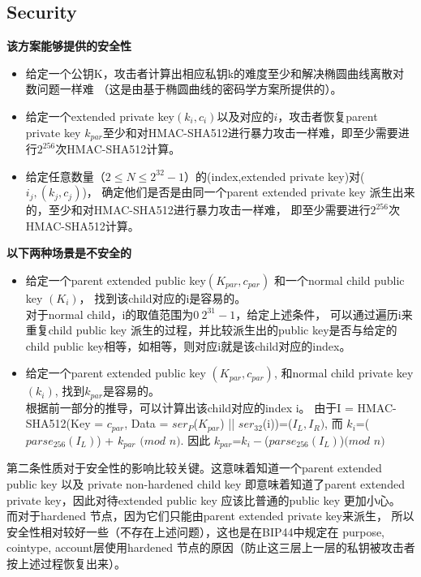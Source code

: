 \subsection{Security}
\label{sec-security}
\textbf{该方案能够提供的安全性}
\begin{itemize}
\item 给定一个公钥K，攻击者计算出相应私钥k的难度至少和解决椭圆曲线离散对数问题一样难
（这是由基于椭圆曲线的密码学方案所提供的）。
\item 给定一个extended private key$(k_i,c_i)$以及对应的$i$，攻击者恢复parent private key $k_{par}$至少和对HMAC-SHA512进行暴力攻击一样难，即至少需要进行$2^{256}$次HMAC-SHA512计算。
\item 给定任意数量（$2\leq N\leq 2^{32}-1$）的(index,extended private key)对($i_j,(k_j,c_j)$)，
确定他们是否是由同一个parent extended private key 派生出来的，至少和对HMAC-SHA512进行暴力攻击一样难，
即至少需要进行$2^{256}$次HMAC-SHA512计算。
\end{itemize}

\textbf{以下两种场景是不安全的}
\begin{itemize}
\item 给定一个parent extended public key$(K_{par},c_{par})$ 和一个normal child public key $(K_i)$，
找到该child对应的i是容易的。\\
对于normal child，i的取值范围为$0~2^{31}-1$，给定上述条件，
可以通过遍历i来重复child public key 派生的过程，并比较派生出的public key是否与给定的child public key相等，如相等，则对应i就是该child对应的index。

\item 给定一个parent extended public key $(K_{par},c_{par})$, 
和normal child private key $(k_i)$, 找到$k_{par}$是容易的。\\
根据前一部分的推导，可以计算出该child对应的index i。  
由于I = HMAC-SHA512(Key = $c_{par}$, Data = $ser_P$($K_{par}$) || $ser_{32}$(i))=($I_L,I_R)$, 
而 $k_i$=($parse_{256}(I_L)$) + $k_{par}$ $(mod$ $n)$.   
因此 $k_{par}$=$k_i-$($parse_{256}(I_L)$)$(mod$ $n)$
\end{itemize}    

第二条性质对于安全性的影响比较关键。这意味着知道一个parent extended public key 
以及 private non-hardened child key
即意味着知道了parent extended private key，因此对待extended public key 
应该比普通的public key 更加小心。
而对于hardened 节点，因为它们只能由parent extended private key来派生，
所以安全性相对较好一些（不存在上述问题），这也是在BIP44中规定在
purpose, cointype, account层使用hardened 节点的原因（防止这三层上一层的私钥被攻击者按上述过程恢复出来）。


